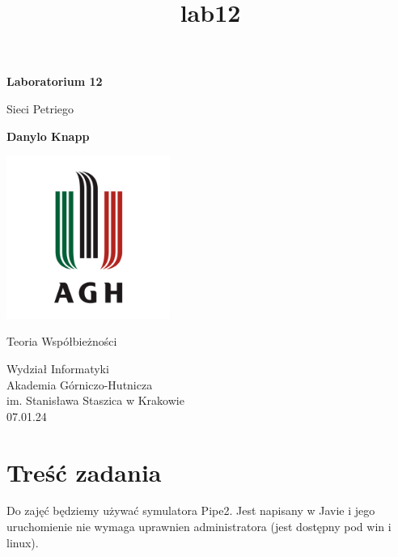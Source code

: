 \documentclass[11pt]{article}
\title{lab12}
\begin{document}
    
    \begin{titlepage}
        \begin{center}
            \vspace*{1cm}
    
            \textbf{Laboratorium 12}
    
            \vspace{0.5cm}
            Sieci Petriego
                
            \vspace{1.5cm}
    
            \textbf{Danylo Knapp}

            \vfill

            \includegraphics[width=0.4\textwidth]{../../report-templates/agh-logo.png}
    
            \vfill
                
            Teoria Współbieżności
                
            \vspace{0.8cm}

            Wydział Informatyki\\
            Akademia Górniczo-Hutnicza\\
            im. Stanisława Staszica w Krakowie\\
            07.01.24
                
        \end{center}
    \end{titlepage}
    
    

    
    \hypertarget{treux15bux107-zadania}{%
\section{Treść zadania}\label{treux15bux107-zadania}}

    Do zajęć będziemy używać symulatora Pipe2. Jest napisany w Javie i jego
uruchomienie nie wymaga uprawnien administratora (jest dostępny pod win
i linux).
\end{document}
